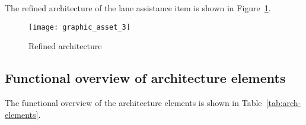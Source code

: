 
The refined architecture of the lane assistance item is shown in Figure~\ref{fig:refined-arch}.

\begin{figure}[!htbp]
\texttt{[image: graphic\_asset\_3]}
\caption{Refined architecture}
\label{fig:refined-arch}
\end{figure}


\subsection{Functional overview of architecture elements}



The functional overview of the architecture elements is
shown in Table~\ref{tab:arch-elements}.

